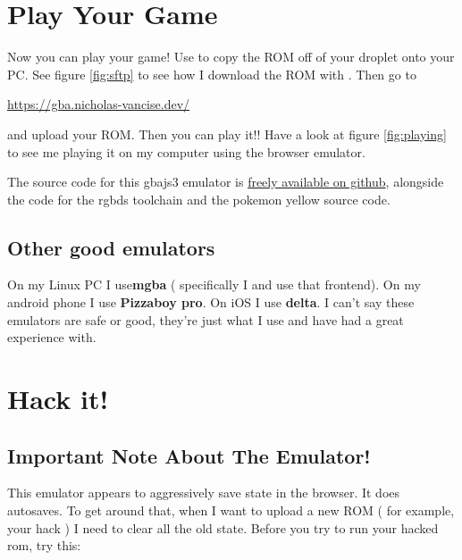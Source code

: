 \documentclass[12pt,a4]{article}
\begin{document}


\clearpage

\section{Play Your Game}
Now you can play your game! Use  to copy the ROM off of your droplet onto your PC. See figure \ref{fig:sftp} to see how I download the ROM with . Then go to 

\begin{center}
    \href{https://gba.nicholas-vancise.dev/}{https://gba.nicholas-vancise.dev/}
\end{center}

and upload your ROM. Then you can play it!! Have a look at figure \ref{fig:playing} to see me playing it on my computer using the browser emulator.

The source code for this gbajs3 emulator is \href{https://github.com/thenick775/gbajs3}{freely available on github}, alongside the code for the rgbds toolchain and the pokemon yellow source code. 




\subsection{Other good emulators}
On my Linux PC I use\textbf{mgba} ( specifically I  and use that frontend). On my android phone I use \textbf{Pizzaboy pro}. On iOS I use \textbf{delta}. I can't say these emulators are safe or good, they're just what I use and have had a great experience with.

\clearpage

\section{Hack it!}
\subsection{Important Note About The Emulator!}
This emulator appears to aggressively save state in the browser. It does autosaves. To get around that, when I want to upload a new ROM ( for example, your hack ) I need to clear all the old state. Before you try to run your hacked rom, try this:
\end{document}
